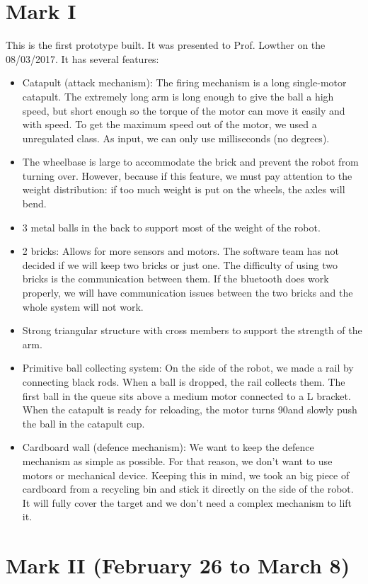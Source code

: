\documentclass[]{article}
\begin{document}
\section{Mark I}
This is the first prototype built.  It was presented to Prof. Lowther on the 08/03/2017.  It has several features:
\begin{itemize}
\item Catapult (attack mechanism): The firing mechanism is a long single-motor catapult.  The extremely long arm is long enough to give the ball a high speed, but short enough so the torque of the motor can move it easily and with speed.  To get the maximum speed out of the motor, we used a unregulated class.  As input, we can only use milliseconds (no degrees). 
\item The wheelbase is large to accommodate the brick and prevent the robot from turning over.  However, because if this feature, we must pay attention to the weight distribution: if too much weight is put on the wheels, the axles will bend.
\item 3 metal balls in the back to support most of the weight of the robot.
\item 2 bricks: Allows for more sensors and motors.  The software team has not decided if we will keep two bricks or just one.  The difficulty of using two bricks is the communication between them.  If the bluetooth does work properly, we will have communication issues between the two bricks and the whole system will not work.    
\item Strong triangular structure with cross members to support the strength of the arm.   
\item Primitive ball collecting system: On the side of the robot, we made a rail by connecting black rods.  When a ball is dropped, the rail collects them.  The first ball in the queue sits above a medium motor connected to a L bracket.  When the catapult is ready for reloading, the motor turns 90\degree and slowly push the ball in the catapult cup.
\item Cardboard wall (defence mechanism): We want to keep the defence mechanism as simple as possible.  For that reason, we don't want to use motors or mechanical device.   Keeping this in mind, we took an big piece of cardboard from a recycling bin and stick it  directly on the side of the robot.  It will fully cover the target and we don't need a complex mechanism to lift it.  
\end{itemize}

\newpage
\section{Mark II (February 26 to March 8)}
\end{document}
